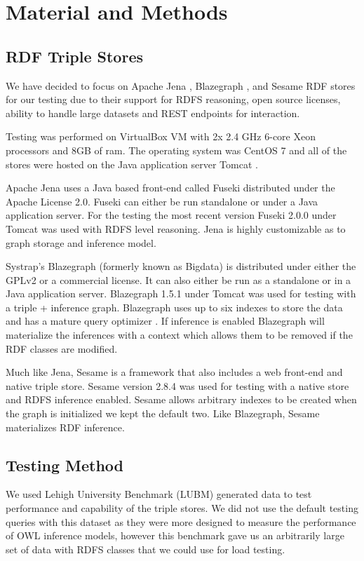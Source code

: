 \documentclass{llncs}
\begin{document}
\section{Material and Methods}
\subsection{RDF Triple Stores}

We have decided to focus on Apache Jena \cite{Jena}, Blazegraph \cite{Blazegraph}, and Sesame \cite{Sesame} RDF stores for our testing due to their support for RDFS reasoning, open source licenses, ability to handle large datasets and REST endpoints for interaction. \cite{Voigt2012}

Testing was performed on VirtualBox VM \cite{Virtualbox} with 2x 2.4 GHz 6-core Xeon processors and 8GB of ram.  The operating system was CentOS 7 \cite{Centos} and all of the stores were hosted on the Java application server Tomcat \cite{Tomcat}.

Apache Jena uses a Java based front-end called Fuseki distributed under the Apache License 2.0.  Fuseki can either be run standalone or under a Java application server.  For the testing the most recent version Fuseki 2.0.0 under Tomcat was used with RDFS level reasoning.  Jena is highly customizable as to graph storage and inference model.

Systrap's Blazegraph (formerly known as Bigdata) is distributed under either the GPLv2 or a commercial license.  It can also either be run as a standalone or in a Java application server.  Blazegraph 1.5.1 under Tomcat was used for testing with a triple + inference graph.  Blazegraph uses up to six indexes to store the data and has a mature query optimizer \cite{RDFDatabaseSystems}.  If inference is enabled Blazegraph will materialize the inferences with a context which allows them to be removed if the RDF classes are modified.

Much like Jena, Sesame is a framework that also includes a web front-end and native triple store.  Sesame version 2.8.4 was used for testing with a native store and RDFS inference enabled.  Sesame allows arbitrary indexes to be created when the graph is initialized we kept the default two.  Like Blazegraph, Sesame materializes RDF inference.

\subsection{Testing Method}
We used Lehigh University Benchmark (LUBM) \cite{Guo2005} generated data to test performance and capability of the triple stores.  We did not use the default testing queries with this dataset as they were more designed to measure the performance of OWL inference models, however this benchmark gave us an arbitrarily large set of data with RDFS classes that we could use for load testing.
\end{document}
